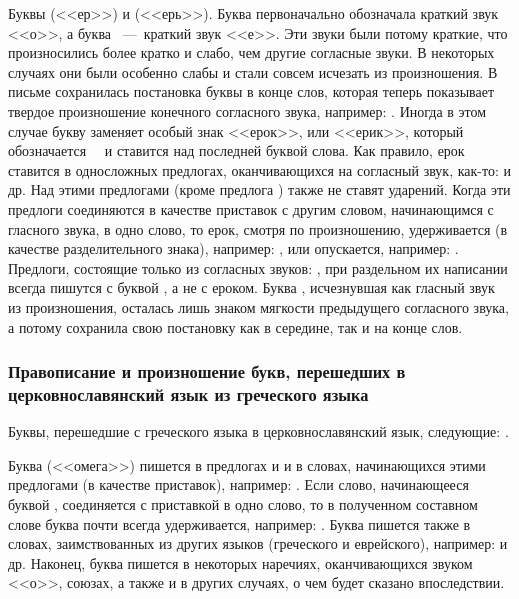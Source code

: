 \documentclass[11pt,a4paper,oneside]{memoir}
\begin{document}
Буквы {} (<<ер>>) и {} (<<ерь>>). Буква {} первоначально обозначала краткий звук <<о>>, а буква {}~---~краткий звук <<е>>. Эти звуки были потому краткие, что произносились более кратко и слабо, чем другие согласные звуки. В некоторых случаях они были особенно слабы и стали совсем исчезать из произношения. В письме сохранилась постановка буквы {} в конце слов, которая теперь показывает твердое произношение конечного согласного звука, например: {}. Иногда в этом случае букву {} заменяет особый знак <<ерок>>, или <<ерик>>, который обозначается~~{} и ставится над последней буквой слова. Как правило, ерок ставится в односложных предлогах, оканчивающихся на согласный звук, как-то: {} и др. Над этими предлогами (кроме предлога {}) также не ставят ударений. Когда эти предлоги соединяются в качестве приставок с другим словом, начинающимся с гласного звука, в одно слово, то ерок, смотря по произношению, удерживается (в качестве разделительного знака), например: {}, или опускается, например: {}. Предлоги, состоящие только из согласных звуков: {}, при раздельном их написании всегда пишутся с буквой {}, а не с ероком. Буква {}, исчезнувшая как гласный звук из произношения, осталась лишь знаком мягкости предыдущего согласного звука, а потому сохранила свою постановку как в середине, так и на конце слов.

\subsubsection{Правописание и произношение букв, перешедших в церковнославянский язык из греческого языка}

Буквы, перешедшие с греческого языка в церковнославянский язык, следующие: {}.

Буква {} (<<омега>>) пишется в предлогах {} и {} и в словах, начинающихся этими предлогами (в качестве приставок), например: {}. Если слово, начинающееся буквой {}, соединяется с приставкой в одно слово, то в полученном составном слове буква {} почти всегда удерживается, например: {}. Буква {} пишется также в словах, заимствованных из других языков (греческого и еврейского), например: {} и др. Наконец, буква {} пишется в некоторых наречиях, оканчивающихся звуком <<о>>, союзах, а также и в других случаях, о чем будет сказано впоследствии.
\end{document}
